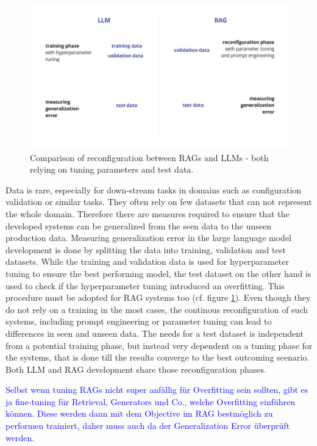 \begin{figure}
    \centering
    \includegraphics[width=\textwidth]{images/RAGvsLLM-tuning.pdf}
    \caption{Comparison of reconfiguration between RAGs and LLMs - both relying on tuning parameters and test data.}
    \label{fig:tuning}
\end{figure}


Data is rare, especially for down-stream tasks in domains such as configuration validation or similar tasks. They often rely on few datasets that can not represent the whole domain. Therefore there are measures required to ensure that the developed systems can be generalized from the seen data to the unseen production data. Measuring generalization error in the large language model development is done by splitting the data into training, validation and test datasets. While the training and validation data is used for hyperparameter tuning to ensure the best performing model, the test dataset on the other hand is used to check if the hyperparameter tuning introduced an overfitting. This procedure must be adopted for RAG systems too (cf. figure \ref{fig:tuning}). Even though they do not rely on a training in the most cases, the continous reconfiguration of such systems, including prompt engineering or parameter tuning can lead to differences in seen and unseen data. The needs for a test dataset is independent from a potential training phase, but instead very dependent on a tuning phase for the systems, that is done till the results converge to the best outcoming scenario. Both LLM and RAG development share those reconfiguration phases. 

\textcolor{blue}{Selbst wenn tuning RAGs nicht super anfällig für Overfitting sein sollten, gibt es ja fine-tuning für Retrieval, Generators und Co., welche Overfitting einführen können. Diese werden dann mit dem Objective im RAG bestmöglich zu performen trainiert, daher muss auch da der Generalization Error überprüft werden.}

